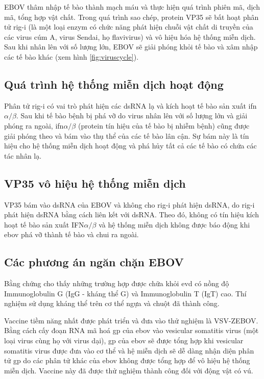 \documentclass[12pt,a4paper,reqno, oneside]{book}
\begin{document}
		EBOV thâm nhập tế bào thành mạch máu và thực hiện quá trình phiên mã, dịch mã, tổng hợp vật chất. Trong quá trình sao chép, protein VP35 sẽ bất hoạt phân tử \gls{rig-i} (là một loại enzym có chức năng phát hiện chuỗi vật chất di truyền của các virus cúm A, virus Sendai, họ flavivirus) và vô hiệu hóa hệ thống miễn dịch. Sau khi nhân lên với số lượng lớn, EBOV sẽ giải phóng khỏi tế bào và xâm nhập các tế bào khác\cite{Colebunders2000} (xem hình \ref{fig:viruscycle}).
\subsection{Quá trình hệ thống miễn dịch hoạt động}

		Phân tử \gls{rig-i} có vai trò phát hiện các dsRNA lạ và kích hoạt tế bào sản xuất \gls{ifn}$\alpha / \beta$\cite{Cardenas2006}. Sau khi tế bào bệnh bị phá vỡ do virus nhân lên với số lượng lớn và giải phóng ra ngoài, \gls{ifn}$\alpha / \beta$ (protein tín hiệu của tế bào bị nhiễm bệnh) cũng được giải phóng theo và bám vào thụ thể của các tế bào lân cận. Sự bám này là tín hiệu cho hệ thống miễn dịch hoạt động và phá hủy tất cả các tế bào có chứa các tác nhân lạ\cite{DeAndrea2002}.
%		
\subsection{VP35 vô hiệu hệ thống miễn dịch}

		VP35 bám vào dsRNA của EBOV và không cho \gls{rig-i} phát hiện dsRNA, do \gls{rig-i} phát hiện dsRNA bằng cách liên kết với dsRNA. Theo đó, không có tín hiệu kích hoạt tế bào sản xuất IFN$\alpha / \beta$ và hệ thống miễn dịch không được báo động khi \gls{ebov} phá vỡ thành tế bào và chui ra ngoài\cite{Hartman2004}.
\subsection{Các phương án ngăn chặn EBOV}
	Bằng chứng cho thấy những trường hợp được chữa khỏi \gls{evd} có nồng độ Immunoglobulin G (IgG - kháng thể G) và Immunoglobulin T (IgT) cao. Thí nghiệm sử dụng kháng thể trên cơ thể ngựa và chuột đã thành công\cite{Feldmann2003}.
	
	Vaccine tiềm năng nhất được phát triển và đưa vào thử nghiệm là VSV-ZEBOV. Bằng cách cấy đoạn RNA mã hoá \gls{gp} của \gls{ebov} vào vesicular somatitis virus (một loại virus cùng họ với virus dại), \gls{gp} của \gls{ebov} sẽ được tổng hợp khi vesicular somatitis virus được đưa vào cơ thể và hệ miễn dịch sẽ dễ dàng nhận diện phân tử \gls{gp} do các phân tử khác của \gls{ebov} không được tổng hợp để vô hiệu hệ thống miễn dịch. Vaccine này đã được thử nghiệm thành công đối với động vật có vú\cite{Mire2015}.
	
\end{document}
